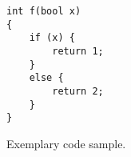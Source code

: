 \begin{figure}[t]
\begin{lstlisting}[frame=single,basicstyle=\ttfamily\small]	
int f(bool x)
{
    if (x) {
		return 1;
	}
	else {
		return 2;
	}
}
\end{lstlisting}
\vspace{-12pt}
\caption{Exemplary code sample.}
\label{figure:sample}
\end{figure}
